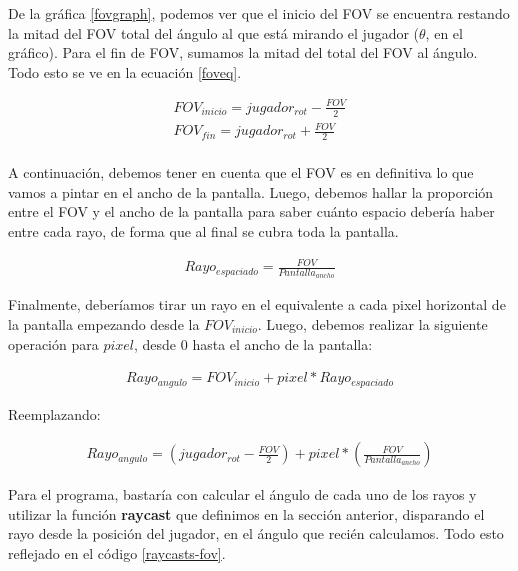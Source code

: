 De la gráfica \ref{fovgraph}, podemos ver que el inicio del FOV se encuentra restando la mitad del FOV total del ángulo al que está mirando el jugador ($\theta$, en el gráfico). Para el fin de FOV, sumamos la mitad del total del FOV al ángulo. Todo esto se ve en la ecuación \ref{foveq}. 

\begin{equation}
\begin{aligned}
\label{foveq}
FOV_{inicio} = jugador_{rot} - \frac{FOV}{2}\\
FOV_{fin} = jugador_{rot} + \frac{FOV}{2} \\
\end{aligned}
\end{equation}

A continuación, debemos tener en cuenta que el FOV es en definitiva lo que vamos a pintar en el ancho de la pantalla. Luego, debemos hallar la proporción entre el FOV y el ancho de la pantalla para saber cuánto espacio debería haber entre cada rayo, de forma que al final se cubra toda la pantalla.

\begin{equation}
\begin{aligned}
\label{foveq}
Rayo_{espaciado} = \frac{FOV}{Pantalla_{ancho}}
\end{aligned}
\end{equation}

Finalmente, deberíamos tirar un rayo en el equivalente a cada pixel horizontal de la pantalla empezando desde la $FOV_{inicio}$. Luego, debemos realizar la siguiente operación para $pixel$, desde 0 hasta el ancho de la pantalla:

\begin{equation}
\begin{aligned}
\label{eq-rayo}
Rayo_{angulo} = FOV_{inicio} + pixel * Rayo_{espaciado} 
\end{aligned}
\end{equation}

Reemplazando:

\begin{equation}
\begin{aligned}
\label{eq-rayo-2}
Rayo_{angulo} = \left(jugador_{rot} - \frac{FOV}{2} \right) + pixel * \left(\frac{FOV}{Pantalla_{ancho}}\right)
\end{aligned}
\end{equation}

Para el programa, bastaría con calcular el ángulo de cada uno de los rayos y utilizar la función \textbf{raycast} que definimos en la sección anterior, disparando el rayo desde la posición del jugador, en el ángulo que recién calculamos. Todo esto reflejado en el código \ref{raycasts-fov}.

